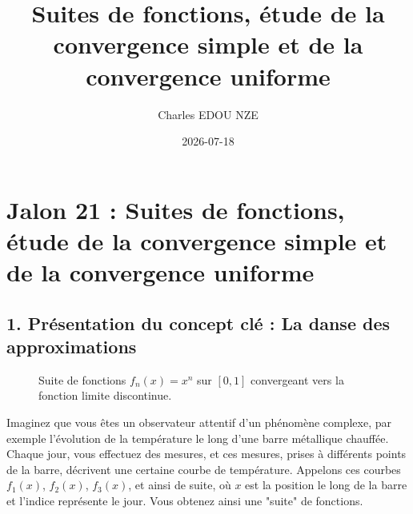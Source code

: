 \documentclass{report}
\title{Suites de fonctions, étude de la convergence simple et de la convergence uniforme}
\author{Charles EDOU NZE}
\date{2026-07-18}
\begin{document}
\maketitle
\tableofcontents
\newpage


\chapter*{Jalon 21 : Suites de fonctions, étude de la convergence simple et de la convergence uniforme}

\section*{1. Présentation du concept clé : La danse des approximations}

\begin{figure}[h]
\centering
{}
\caption{Suite de fonctions $f_n(x) = x^n$ sur $[0,1]$ convergeant vers la fonction limite discontinue.}
\end{figure}


Imaginez que vous êtes un observateur attentif d'un phénomène complexe, par exemple l'évolution de la température le long d'une barre métallique chauffée. Chaque jour, vous effectuez des mesures, et ces mesures, prises à différents points de la barre, décrivent une certaine courbe de température. Appelons ces courbes $f_1(x)$, $f_2(x)$, $f_3(x)$, et ainsi de suite, où $x$ est la position le long de la barre et l'indice représente le jour. Vous obtenez ainsi une "suite" de fonctions.
\end{document}
